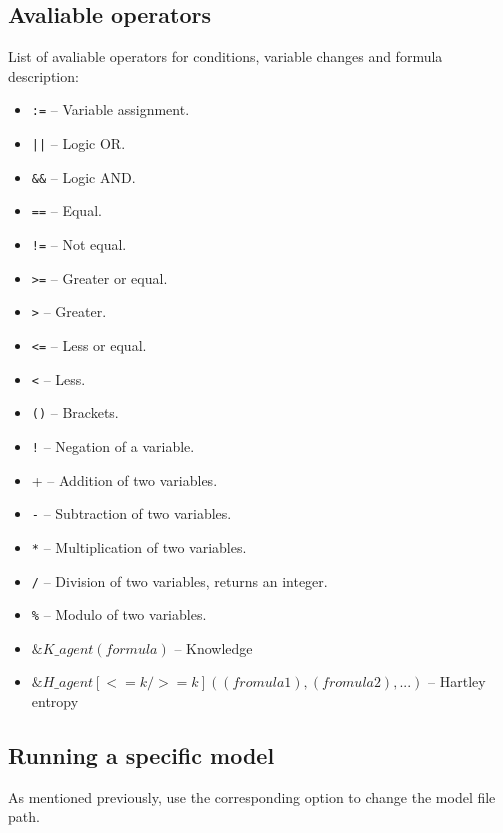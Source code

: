 \documentclass[12pt]{article}
\begin{document}
\subsection{Avaliable operators}
List of avaliable operators for conditions, variable changes and formula description:
\begin{itemize}
  \item \verb+:=+ -- Variable assignment.
  \item \verb+||+ -- Logic OR.
  \item \verb+&&+ -- Logic AND.
  \item \verb+==+ -- Equal.
  \item \verb+!=+ -- Not equal.
  \item \verb+>=+ -- Greater or equal.
  \item \verb+>+ -- Greater.
  \item \verb+<=+ -- Less or equal.
  \item \verb+<+ -- Less.
  \item \verb+()+ -- Brackets.
  \item \verb+!+ -- Negation of a variable.
  \item \verb+++ -- Addition of two variables.
  \item \verb+-+ -- Subtraction of two variables.
  \item \verb+*+ -- Multiplication of two variables.
  \item \verb+/+ -- Division of two variables, returns an integer.
  \item \verb+%+ -- Modulo of two variables.
  \item $\&K{\_}agent(formula)$ -- Knowledge
  \item $\&H{\_}agent[<=k/>=k]((fromula1), (fromula2), ...)$ -- Hartley entropy
\end{itemize}



\subsection{Running a specific model}
As mentioned previously, use the corresponding option to change the model file path.
\end{document}
